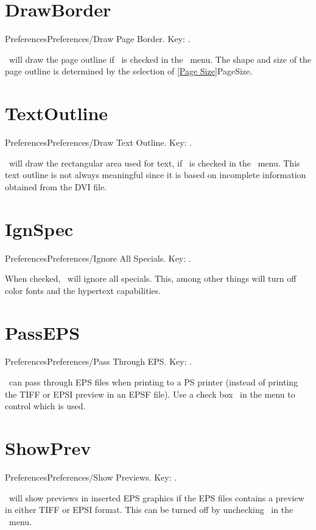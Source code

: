 \newpage
   
\section{DrawBorder}{Preferences}Preferences/Draw Page Border. Key: \none.

\ will draw the page outline if \ is
checked in the \ menu.
The shape and size of the page outline is determined by the selection
of \ref{Page Size}{PageSize}.
   \bigskip

\section{TextOutline}{Preferences}Preferences/Draw Text Outline. Key: \none.

\ will draw the rectangular area used for text, if
\ is checked in the \ menu.  This text
outline is not always meaningful since it is based on incomplete information
obtained from the DVI file.
   \bigskip

\newpage

\section{IgnSpec}{Preferences}Preferences/Ignore All Specials. Key: \none.

When checked, \ will ignore all specials.  This, among
other things will turn off color fonts and the hypertext capabilities. 
   \bigskip

\section{PassEPS}{Preferences}Preferences/Pass Through EPS. Key: \none.

\ can pass through EPS files when printing to a PS printer
(instead of printing the TIFF or EPSI preview in an EPSF file).
Use a check box \ in the  menu to
control which is used.
   \bigskip

\section{ShowPrev}{Preferences}Preferences/Show Previews.  Key: \none.

\ will show previews in inserted EPS graphics if the 
EPS files contains a preview in either TIFF or EPSI format. This
can be turned off by unchecking \ in the
\ menu. 
   \bigskip

